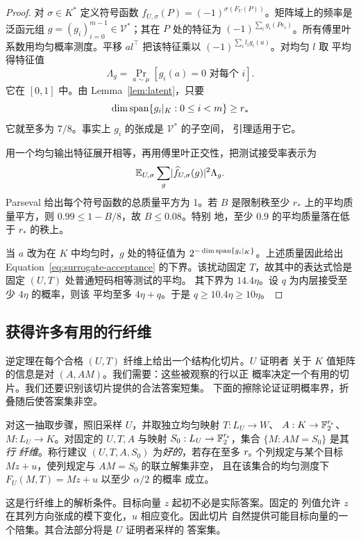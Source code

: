 \begin{proof}
对 $\sigma\in K^*$ 定义符号函数
$f_{U,\sigma}(P)=(-1)^{\sigma(F_U(P))}$。矩阵域上的频率是泛函元组
$g=(g_i)_{i=0}^{m-1}\in\mathcal V^*$；其在 $P$ 处的特征为
$(-1)^{\sum_i g_i(Pe_i)}$。所有傅里叶系数用均匀概率测度。平移
$a l^\top$ 把该特征乘以 $(-1)^{\sum_i l_i g_i(a)}$。对均匀 $l$ 取
平均得特征值
\[
 \Lambda_g=\Pr_{a\sim\mu}[g_i(a)=0\text{ 对每个 }i].
\]
它在 $[0,1]$ 中。由 Lemma~\ref{lem:latent}，只要
\[
 \dim\operatorname{span}\{g_i|_K:0\le i<m\}\ge r_*
\]
它就至多为 $7/8$。事实上 $g_i$ 的张成是 $\mathcal V^*$ 的子空间，
引理适用于它。

用一个均匀输出特征展开相等，再用傅里叶正交性，把测试接受率表示为
\[
 \mathbb E_{U,\sigma}\sum_g
      \lvert \widehat f_{U,\sigma}(g)\rvert^2\Lambda_g.
\]
Parseval 给出每个符号函数的总质量平方为 1。若 $B$ 是限制秩至少
$r_*$ 上的平均质量平方，则 $0.99\le1-B/8$，故 $B\le0.08$。特别
地，至少 $0.9$ 的平均质量落在低于 $r_*$ 的秩上。

当 $a$ 改为在 $K$ 中均匀时，$g$ 处的特征值为
$2^{-\dim\operatorname{span}\{g_i|_K\}}$。上述质量因此给出
Equation~\eqref{eq:surrogate-acceptance} 的下界。该扰动固定
$T$，故其中的表达式恰是固定 $(U,T)$ 处普通短码相等测试的平均。
其下界为 $14.4\eta$。设 $q$ 为内层接受至少 $4\eta$ 的概率，则该
平均至多 $4\eta+q$。于是 $q\ge10.4\eta\ge10\eta$。
\end{proof}

\subsection{获得许多有用的行纤维}

逆定理在每个合格 $(U,T)$ 纤维上给出一个结构化切片。$U$ 证明者
关于 $K$ 值矩阵的信息是对 $(A,AM)$。我们需要：这些被观察的行以正
概率决定一个有用的切片。我们还要识别该切片提供的合法答案短集。
下面的擦除论证证明概率界，折叠随后使答案集非空。

对这一抽取步骤，照旧采样 $U$，并取独立均匀映射 $T:L_U\to W$、
$A:K\to\mathbb F_2^{r_{\rm s}}$、$M:L_U\to K$。对固定的 $U,T,A$ 与映射
$S_0:L_U\to\mathbb F_2^{r_{\rm s}}$，集合 $\{M:AM=S_0\}$ 是其\emph{行
纤维}。称行建议 $(U,T,A,S_0)$ 为\emph{好的}，若存在至多 $r_{\rm s}$
个列规定与某个目标 $Mz+u$，使列规定与 $AM=S_0$ 的联立解集非空，
且在该集合的均匀测度下 $F_U(M,T)=Mz+u$ 以至少 $\alpha/2$ 的概率
成立。

这是行纤维上的解析条件。目标向量 $z$ 起初不必是实际答案。固定的
列值允许 $z$ 在其列方向张成的模下变化，$u$ 相应变化。因此切片
自然提供可能目标向量的一个陪集。其合法部分将是 $U$ 证明者采样的
答案集。

